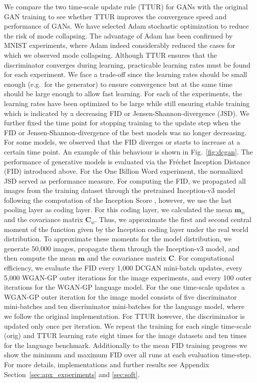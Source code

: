 \documentclass{article}
\newcommand\Bm{\bm{m}}
\newcommand\BC{\bm{C}}
\begin{document}
We compare the two time-scale update rule (TTUR) for GANs with the original GAN
training to see whether TTUR improves the convergence speed and performance of
GANs. We have selected Adam stochastic optimization to reduce the risk of mode
collapsing. The advantage of Adam has been confirmed by MNIST experiments, where
Adam indeed considerably reduced the cases for which we observed mode
collapsing. Although TTUR ensures that the discriminator converges during
learning, practicable learning rates must be found for each experiment.
We face a trade-off since the learning rates should be small enough (e.g.\ for
the generator) to ensure convergence but at the same time should be large enough
to allow fast learning. For each of the experiments, the learning rates have
been optimized to be large while still ensuring stable training which is
indicated by a decreasing FID or Jensen-Shannon-divergence (JSD). We further
fixed the time point for stopping training to the update step when the FID or
Jensen-Shannon-divergence of the best models was no longer decreasing. For some
models, we observed that the FID diverges or starts to increase at a certain
time point. An example of this behaviour is shown in Fig.~\ref{fig:dcgan}. The
performance of generative models is evaluated via the Fr\'{e}chet Inception
Distance (FID) introduced above.
For the One Billion Word experiment, the normalized JSD served as performance
measure. For computing the FID, we propagated all images from the training
dataset through the pretrained Inception-v3 model following the computation of
the Inception Score \cite{Salimans:16}, however, we use the last pooling layer
as coding layer. For this coding layer, we calculated the mean $\Bm_w$ and the
covariance matrix $\BC_w$. Thus, we approximate the first and second central
moment of the function given by the Inception coding layer under the real world
distribution. To approximate these moments for the model distribution, we
generate 50,000 images, propagate them through the Inception-v3 model, and
then compute the mean $\Bm$ and the covariance matrix $\BC$.
For computational efficiency, we evaluate the FID every 1,000 DCGAN mini-batch
updates, every 5,000 WGAN-GP outer iterations for the image experiments, and
every 100 outer iterations for the WGAN-GP language model. For the one
time-scale updates a WGAN-GP outer iteration for the image model consists of five
discriminator mini-batches and ten discriminator mini-batches for the language
model, where we follow the original implementation. For TTUR however, the
discriminator is updated only once per iteration. We repeat the training for each single time-scale
(orig) and TTUR learning rate eight times for the image datasets and ten times for the language benchmark.
Additionally to the mean FID training progress we show the minimum and maximum
FID over all runs at each evaluation time-step. For more details,
implementations and further results see Appendix
Section~\ref{sec:apx_experiments} and \ref{sec:soft}.
\end{document}

